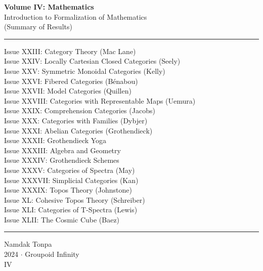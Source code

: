 \documentclass{article}
\begin{document}
\begin{titlepage}
    \centering
    \vspace*{0.5in}
    \Huge
    \textbf{Volume IV: Mathematics} \\
    \LARGE
    Introduction to Formalization of Mathematics \\
    (Summary of Results) \\
    \vspace{1.5in}
    \rule{\textwidth}{0.4pt}
    \small
    \flushleft
    Issue XXIII: Category Theory (Mac Lane) \\
    Issue XXIV: Locally Cartesian Closed Categories (Seely) \\
    Issue XXV: Symmetric Monoidal Categories (Kelly) \\
    Issue XXVI: Fibered Categories (Bénabou) \\
    Issue XXVII: Model Categories (Quillen) \\
    Issue XXVIII: Categories with Representable Maps (Uemura) \\
    Issue XXIX: Comprehension Categories (Jacobs) \\
    Issue XXX: Categories with Families (Dybjer) \\
    Issue XXXI: Abelian Categories (Grothendieck) \\
    Issue XXXII: Grothendieck Yoga \\
    Issue XXXIII: Algebra and Geometry \\
    Issue XXXIV: Grothendieck Schemes \\
    Issue XXXV: Categories of Spectra (May) \\
    Issue XXXVII: Simplicial Categories (Kan) \\
    Issue XXXIX: Topos Theory (Johnstone) \\
    Issue XL: Cohesive Topos Theory (Schreiber) \\
    Issue XLI: Categories of T-Spectra (Lewis) \\
    Issue XLII: The Cosmic Cube (Baez) \\
    \rule{\textwidth}{0.4pt}
    \centering
    \vfill
    \large
    Namdak Tonpa \\
    \Large
    2024 $\cdot$ Groupoid Infinity \\
    IV
\end{titlepage}
\end{document}
